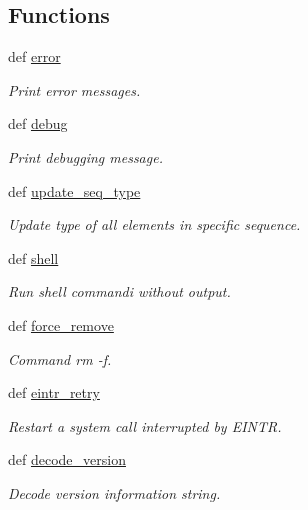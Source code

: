 \subsection*{Functions}
\begin{DoxyCompactItemize}
\item 
def \hyperlink{namespaceadmin_ae1e80d1a965f6551fa95ff379ba2b0cd}{error}
\begin{DoxyCompactList}\small\item\em Print error messages. \end{DoxyCompactList}\item 
def \hyperlink{namespaceadmin_a575bcc44ebed9e68574ccb636a66a4d2}{debug}
\begin{DoxyCompactList}\small\item\em Print debugging message. \end{DoxyCompactList}\item 
def \hyperlink{namespaceadmin_ae1dbeff3e935d67ed99b95eb814c9a11}{update\-\_\-seq\-\_\-type}
\begin{DoxyCompactList}\small\item\em Update type of all elements in specific sequence. \end{DoxyCompactList}\item 
def \hyperlink{namespaceadmin_a31f458a81de75174d8424d5859164f48}{shell}
\begin{DoxyCompactList}\small\item\em Run shell commandi without output. \end{DoxyCompactList}\item 
def \hyperlink{namespaceadmin_a8b0cb2905f04979a2db7cf3bb181ad00}{force\-\_\-remove}
\begin{DoxyCompactList}\small\item\em Command {\ttfamily rm -\/f}. \end{DoxyCompactList}\item 
def \hyperlink{namespaceadmin_a186685a5e2120c71362c46b35f0705c3}{eintr\-\_\-retry}
\begin{DoxyCompactList}\small\item\em Restart a system call interrupted by {\ttfamily E\-I\-N\-T\-R}. \end{DoxyCompactList}\item 
def \hyperlink{namespaceadmin_a2605170b60fdae0f26432f209ed71f49}{decode\-\_\-version}
\begin{DoxyCompactList}\small\item\em Decode version information string. \end{DoxyCompactList}\item 

\end{DoxyCompactItemize}
